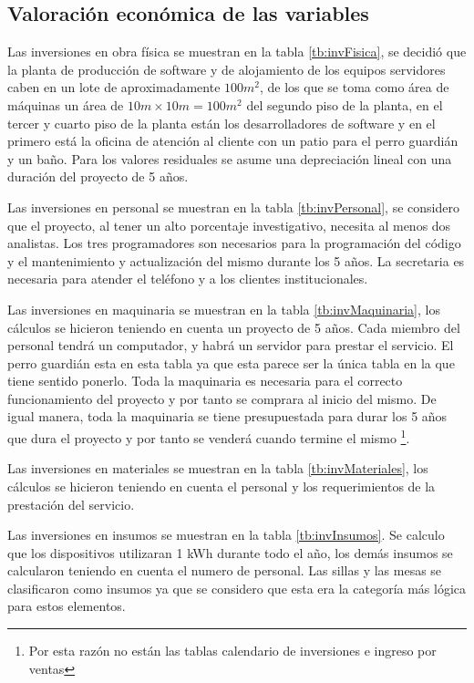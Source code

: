 \documentclass[a4paper, 12pt, oneside]{article}
\begin{document}
	\subsection{Valoración económica de las variables}
	Las inversiones en obra física se muestran en la tabla \ref{tb:invFisica}, se decidió que la planta de producción de software y de alojamiento de los equipos servidores caben en un lote de aproximadamente $100m^2$, de los que se toma como área de máquinas un área de $10m \times 10m = 100m^2$ del segundo piso de la planta, en el tercer y cuarto piso de la planta están los desarrolladores de software y en el primero está la oficina de atención al cliente con un patio para el perro guardián y un baño. Para los valores residuales se asume una depreciación lineal con una duración del proyecto de 5 años.

	Las inversiones en personal se muestran en la tabla \ref{tb:invPersonal}, se considero que el proyecto, al tener un alto porcentaje investigativo, necesita al menos dos analistas. Los tres programadores son necesarios para la programación del código y el mantenimiento y actualización del mismo durante los 5 años. La secretaria es necesaria para atender el teléfono y a los clientes institucionales.

	Las inversiones en maquinaria se muestran en la tabla \ref{tb:invMaquinaria}, los cálculos se hicieron teniendo en cuenta un proyecto de 5 años. Cada miembro del personal tendrá un computador, y habrá un servidor para prestar el servicio. El perro guardián esta en esta tabla ya que esta parece ser la única tabla en la que tiene sentido ponerlo. Toda la maquinaria es necesaria para el correcto funcionamiento del proyecto y por tanto se comprara al inicio del mismo. De igual manera, toda la maquinaria se tiene presupuestada para durar los 5 años que dura el proyecto y por tanto se venderá cuando termine el mismo \footnote{Por esta razón no están las tablas calendario de inversiones e ingreso por ventas}.
	
	Las inversiones en materiales se muestran en la tabla \ref{tb:invMateriales}, los cálculos se hicieron teniendo en cuenta el personal y los requerimientos de la prestación del servicio.

	Las inversiones en insumos se muestran en la tabla \ref{tb:invInsumos}. Se calculo que los dispositivos utilizaran 1 kWh durante todo el año, los demás insumos se calcularon teniendo en cuenta el numero de personal. Las sillas y las mesas se clasificaron como insumos ya que se considero que esta era la categoría más lógica para estos elementos.
	
\end{document}
